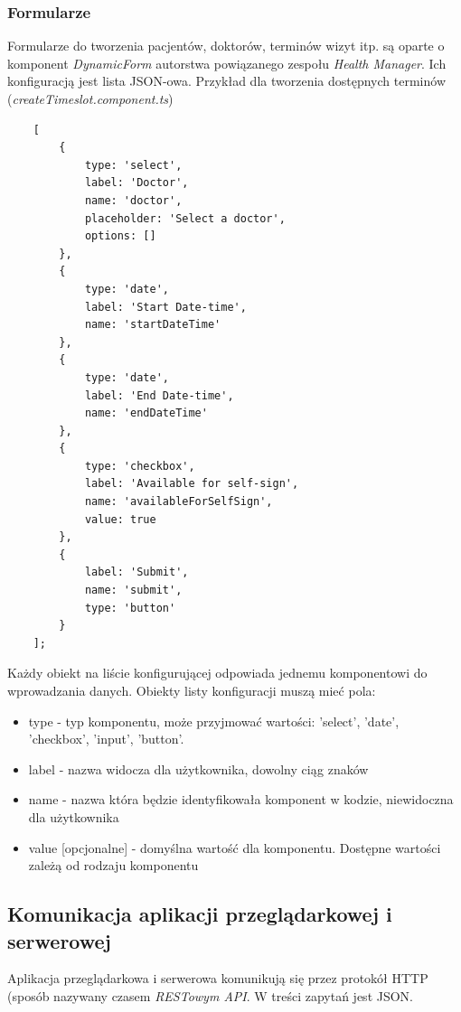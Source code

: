 \documentclass[polish,12pt]{aghthesis}
\begin{document}
\subsubsection{Formularze}
Formularze do tworzenia pacjentów, doktorów, terminów wizyt itp. są oparte o komponent \emph{DynamicForm} autorstwa powiązanego zespołu \emph{Health Manager}.
Ich konfiguracją jest lista JSON-owa. Przykład dla tworzenia dostępnych terminów (\emph{createTimeslot.component.ts})
\begin{verbatim}
    [
        {
            type: 'select',
            label: 'Doctor',
            name: 'doctor',
            placeholder: 'Select a doctor',
            options: []
        },
        {
            type: 'date',
            label: 'Start Date-time',
            name: 'startDateTime'
        },
        {
            type: 'date',
            label: 'End Date-time',
            name: 'endDateTime'
        },
        {
            type: 'checkbox',
            label: 'Available for self-sign',
            name: 'availableForSelfSign',
            value: true
        },
        {
            label: 'Submit',
            name: 'submit',
            type: 'button'
        }
    ];
\end{verbatim}
Każdy obiekt na liście konfigurującej odpowiada jednemu komponentowi do wprowadzania danych. Obiekty listy konfiguracji muszą mieć pola:
\begin{itemize}
    \item type - typ komponentu, może przyjmować wartości: 'select', 'date', 'checkbox', 'input', 'button'.
    \item label - nazwa widocza dla użytkownika, dowolny ciąg znaków
    \item name - nazwa która będzie identyfikowała komponent w kodzie, niewidoczna dla użytkownika
    \item value [opcjonalne] - domyślna wartość dla komponentu. Dostępne wartości zależą od rodzaju komponentu
\end{itemize}

\subsection{Komunikacja aplikacji przeglądarkowej i serwerowej}
Aplikacja przeglądarkowa i serwerowa komunikują się przez protokół HTTP (sposób nazywany czasem \emph{RESTowym API}. W treści zapytań jest JSON.
\end{document}
